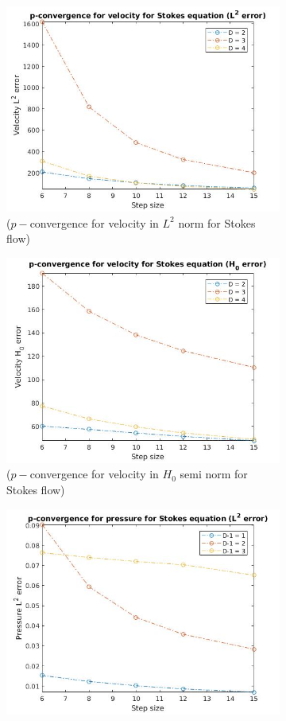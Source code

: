 \documentclass[a4paper,openany]{book}
\begin{document}
\begin{figure}
\begin{subfigure}{\textwidth}
\centering
  \includegraphics[width=0.8\linewidth]{p_conv_velocity_l2_stokes.jpg}
  \caption{($p-$convergence for velocity in $L^2$ norm for Stokes flow)}
  \label{p_convergence_velocity_l2}
\end{subfigure}
\begin{subfigure}{\textwidth}
\centering
  \includegraphics[width=0.8\linewidth]{p_conv_velocity_h0_stokes.jpg}
  \caption{($p-$convergence for velocity in $H_0$ semi norm for Stokes flow)}
  \label{p_convergence_velocity_h0}
\end{subfigure}
\begin{subfigure}{\textwidth}
\centering
  \includegraphics[width=0.8\linewidth]{p_conv_pressure_l2_stokes.jpg}

\end{subfigure}
\end{figure}
\end{document}
